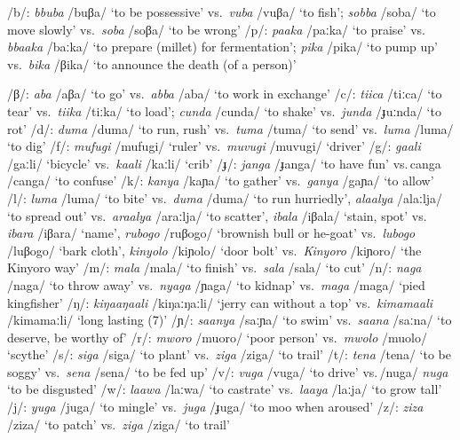 \newpage
\ea \label{ex-phon-consonants}
\begin{xlist}
	\ex /b/:  \textit{bbuba} /buβa/ `to be possessive’ vs.\, \textit{vuba} /vuβa/ `to fish';  \textit{sobba} /soba/ `to move slowly' vs.\, \textit{soba} /soβa/ `to be wrong'
	\ex /p/:  \textit{paaka} /paːka/ `to praise' vs.\, \textit{bbaaka} /baːka/ `to prepare (millet) for fermentation';  \textit{pika} /pika/ `to pump up’ vs.\, \textit{bika} /βika/ `to announce the death (of a person)' 

	\ex /β/:  \textit{aba} /aβa/  `to go’ vs.\, \textit{abba} /aba/ `to work in exchange'
	\ex /c/:  \textit{tiica} /tiːca/ `to tear’ vs.\, \textit{tiika} /tiːka/ `to load';  \textit{cunda} /cunda/ `to shake' vs.\, \textit{junda} /ɟuːnda/ `to rot'
	\ex /d/:  \textit{duma} /duma/  `to run, rush’ vs.\, \textit{tuma} /tuma/ ‘to send’ vs.\,  \textit{luma}  /luma/ `to dig' 
	\ex /f/:   \textit{mufugi} /mufugi/ ‘ruler’ vs.\, \textit{muvugi}  /muvugi/ ‘driver’
	\ex /g/:   \textit{gaali} /gaːli/ ‘bicycle’ vs.\, \textit{kaali} /kaːli/ ‘crib’  
	\ex /ɟ/:	 \textit{janga} /ɟanga/ `to have fun' vs.\,canga /canga/ `to confuse'
	\ex /k/:	 \textit{kanya} /kaɲa/ `to gather' vs.\, \textit{ganya} /gaɲa/ `to allow'
	\ex /l/:	\label{ex-phono-l}
	 \textit{luma} /luma/  ‘to bite’ vs.\, \textit{duma} /duma/ ‘to run hurriedly’,  \textit{alaalya} /alaːlja/ `to spread out' vs.\, \textit{araalya} /araːlja/ `to scatter',  \textit{ibala} /iβala/ `stain, spot' vs.\, \textit{ibara} /iβara/ `name',  \textit{rubogo} /ruβogo/ `brownish bull or he-goat' vs.\, \textit{lubogo} /luβogo/ `bark cloth',  \textit{kinyolo} /kiɲolo/ `door bolt' vs.\, \textit{Kinyoro} /kiɲoro/ `the Kinyoro way'
	\ex /m/:	  \textit{mala}  /mala/  ‘to finish’ vs.\, \textit{sala} /sala/ ‘to cut’
	\ex /n/:	 \textit{naga}  /naga/  ‘to throw away’ vs.\,  \textit{nyaga} /ɲaga/ `to kidnap' vs.\,  \textit{maga} /maga/ ‘pied kingfisher’
	\ex /ŋ/:  \textit{kiŋaaŋaali} /kiŋaːŋaːli/ ‘jerry can without a top’ vs.\,  \textit{kima\-maa\-li} /kimamaːli/ ‘long lasting (7)'
 \ex /ɲ/:	 \textit{saanya} /saːɲa/ `to swim' vs.\, \textit{saana} /saːna/ `to deserve, be worthy of' 
\ex \label{ex-phono-r}
/r/:	 \textit{mworo} /muoro/  ‘poor person’ vs.\, \textit{mwolo}  /muolo/ ‘scythe’
\ex /s/:	  \textit{siga} /siga/ ‘to plant’ vs.\, \textit{ziga} /ziga/ ‘to trail’
\ex /t/:	  \textit{tena}  /tena/ ‘to be soggy’ vs.\,  \textit{sena}  /sena/ ‘to be fed up’
\ex /v/:	 \textit{vuga}  /vuga/  ‘to drive’ vs.\,/nuga/  \textit{nuga} ‘to be disgusted’
\ex /w/:	 \textit{laawa} /laːwa/ `to castrate' vs.\, \textit{laaya} /laːja/ `to grow tall'
\ex /j/:   \textit{yuga} /juga/  `to mingle'  vs.\,  \textit{juga} /ɟuga/	`to moo when aroused' 
\ex /z/:	  \textit{ziza} /ziza/ ‘to patch’ vs.\,  \textit{ziga}  /ziga/ ‘to trail’
\end{xlist}	
\z

